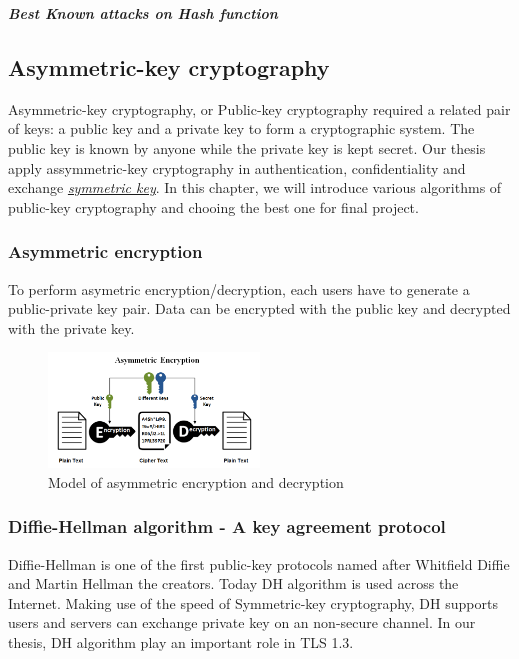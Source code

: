 \bigskip
{\textit {\textbf{Best Known attacks on Hash function}}}

\subsection{Asymmetric-key cryptography}
\label{sec:asymmetric_cryptography}
Asymmetric-key cryptography, or Public-key cryptography required a related pair of keys: a public key and a private key to form a cryptographic system.
The public key is known by anyone while the private key is kept secret. Our thesis apply assymmetric-key cryptography in authentication, confidentiality and exchange \emph{\hyperref[sec: Symmetric_keys]{symmetric key}}.
In this chapter, we will introduce various algorithms of public-key cryptography and chooing the best one for final project.
	
\subsubsection{Asymmetric encryption}
To perform asymetric encryption/decryption, each users have to generate a public-private key pair.
Data can be encrypted with the public key and decrypted with the private key. 

\begin{figure}[h!]
	\centering
	\includegraphics[width=0.5\textwidth]{images/asymmetric_encrypt.png}
	\caption[Model of asymmetric encryption and decryption]{Model of asymmetric encryption and decryption}
	\label{fig:asymmetric_encrypt}
\end{figure}

\subsubsection{Diffie-Hellman algorithm - A key agreement protocol}
Diffie-Hellman is one of the first public-key protocols named after Whitfield Diffie and Martin Hellman the creators.
Today DH algorithm is used across the Internet.
Making use of the speed of Symmetric-key cryptography, DH supports users and servers can exchange private key on an non-secure channel.
In our thesis, DH algorithm play an important role in TLS 1.3.

